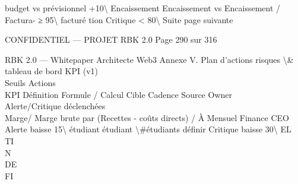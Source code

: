 \documentclass[12pt,landscape,a4paper]{article}
\newenvironment{confidential}
{\begin{tcolorbox}[
    colback=rbkred!5!white,
    colframe=rbkred!75!black,
    title=CONFIDENTIEL,
    fonttitle=\bfseries\color{white},
    coltitle=rbkred!75!black,
    breakable,
    enhanced,
    frame hidden,
    borderline west={2pt}{0pt}{rbkred!75!black}
]}
{\end{tcolorbox}}
\begin{document}
budget         vs prévisionnel                               +10\textbackslash{}%
Encaissement   Encaissement vs Encaissement / Factura-       ≥ 95\textbackslash{}%
facturé           tion                                                                   Critique \textless{} 80\textbackslash{}%
Suite page suivante\\
\vspace{0.5em}
\vspace{0.5em}
\vspace{0.5em}
\vspace{0.5em}
\begin{confidential}CONFIDENTIEL — PROJET RBK 2.0                                                 Page 290 sur 316\end{confidential}
RBK 2.0 — Whitepaper Architecte Web3                                                                      Annexe V. Plan d’actions risques \textbackslash{}& tableau de bord KPI (v1)\\
\vspace{0.5em}
\vspace{0.5em}
Seuils                Actions\\
KPI           Définition        Formule / Calcul             Cible     Cadence   Source    Owner\\
Alerte/Critique       déclenchées\\
Marge/        Marge brute par   (Recettes - coûts directs) / À         Mensuel   Finance   CEO     Alerte baisse 15\textbackslash{}%
étudiant      étudiant          \textbackslash{}#étudiants                   définir                               Critique baisse 30\textbackslash{}%
\vspace{0.5em}
\vspace{0.5em}
\vspace{0.5em}
\vspace{0.5em}
EL\\
TI\\
N\\
DE\\
FI\\
\end{document}
